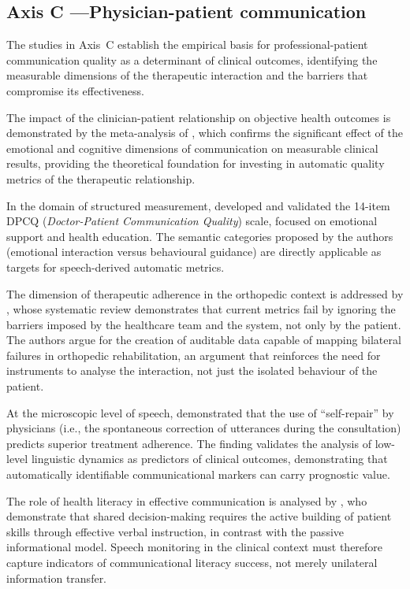 \documentclass[review,12pt]{elsarticle}
\begin{document}
\subsection{Axis C —Physician-patient communication}
\label{subsec:eixoC}

The studies in Axis~C establish the empirical basis for professional-patient
communication quality as a determinant of clinical outcomes, identifying the
measurable dimensions of the therapeutic interaction and the barriers that
compromise its effectiveness.

The impact of the clinician-patient relationship on objective health outcomes
is demonstrated by the meta-analysis of \citet{Kelley2014}, which confirms
the significant effect of the emotional and cognitive dimensions of
communication on measurable clinical results, providing the theoretical
foundation for investing in automatic quality metrics of the therapeutic
relationship.

In the domain of structured measurement, \citet{Shao2025} developed and
validated the 14-item DPCQ (\textit{Doctor-Patient Communication Quality})
scale, focused on emotional support and health education. The semantic
categories proposed by the authors (emotional interaction versus behavioural
guidance) are directly applicable as targets for speech-derived automatic
metrics.

The dimension of therapeutic adherence in the orthopedic context is addressed
by \citet{Rucinski2022}, whose systematic review demonstrates that current
metrics fail by ignoring the barriers imposed by the healthcare team and the
system, not only by the patient. The authors argue for the creation of
auditable data capable of mapping bilateral failures in orthopedic
rehabilitation, an argument that reinforces the need for instruments to
analyse the interaction, not just the isolated behaviour of the patient.

At the microscopic level of speech, \citet{McCabe2018} demonstrated that the
use of \enquote{self-repair} by physicians (i.e., the spontaneous correction
of utterances during the consultation) predicts superior treatment adherence.
The finding validates the analysis of low-level linguistic dynamics as
predictors of clinical outcomes, demonstrating that automatically identifiable
communicational markers can carry prognostic value.

The role of health literacy in effective communication is analysed by
\citet{Muscat2020}, who demonstrate that shared decision-making requires the
active building of patient skills through effective verbal instruction, in
contrast with the passive informational model. Speech monitoring in the
clinical context must therefore capture indicators of communicational literacy
success, not merely unilateral information transfer.
\end{document}
